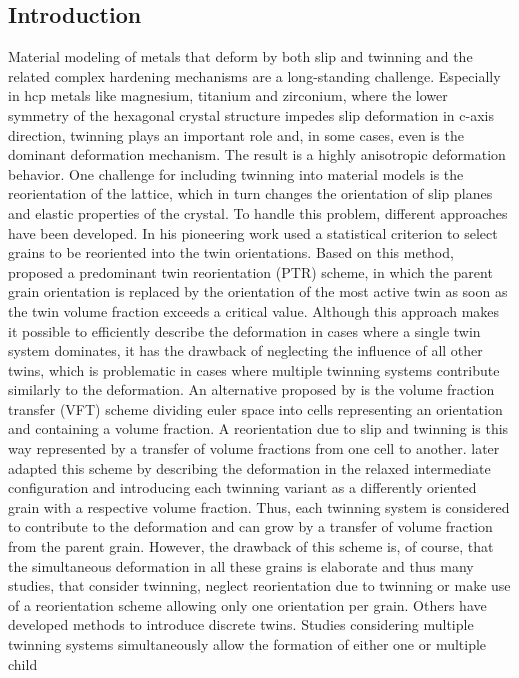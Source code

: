 \subsection{Introduction}
Material modeling of metals that deform by both slip and twinning and the related complex hardening mechanisms are a long-standing challenge. Especially in hcp metals like magnesium, titanium and zirconium, where the lower symmetry of the hexagonal crystal structure impedes slip deformation in c-axis direction, twinning plays an important role and, in some cases, even is the dominant deformation mechanism\supercite{yoo1981slip,yoo1991deformation,christian1995deformation,barnett2007twinning1,beyerlein2014growth,kannan2018mechanics}. The result is a highly anisotropic deformation behavior. One challenge for including twinning into material models is the reorientation of the lattice, which in turn changes the orientation of slip planes and elastic properties of the crystal. To handle this problem, different approaches have been developed. In his pioneering work  used a statistical criterion to select grains to be reoriented into the twin orientations. Based on this method,  proposed a predominant twin reorientation (PTR) scheme, in which the parent grain orientation is replaced by the orientation of the most active twin as soon as the twin volume fraction exceeds a critical value. Although this approach makes it possible to efficiently describe the deformation in cases where a single twin system dominates, it has the drawback of neglecting the influence of all other twins, which is problematic in cases where multiple twinning systems contribute similarly to the deformation. An alternative proposed by  is the volume fraction transfer (VFT) scheme dividing euler space into cells representing an orientation and containing a volume fraction. A reorientation due to slip and twinning is this way represented by a transfer of volume fractions from one cell to another.  later adapted this scheme by describing the deformation in the relaxed intermediate configuration and introducing each twinning variant as a differently oriented grain with a respective volume fraction. Thus, each twinning system is considered to contribute to the deformation and can grow by a transfer of volume fraction from the parent grain. However, the drawback of this scheme is, of course, that the simultaneous deformation in all these grains is elaborate and thus many studies, that consider twinning, neglect reorientation due to twinning\supercite{graff2007yielding,abdolvand2015study} or make use of a reorientation scheme allowing only one orientation per grain\supercite{karaman2000modeling,fernandez2011continuum,zhang2012phenomenological,qiao2016modeling,hama2017crystal,briffod2019numerical,zhang2019multi-scale}. Others have developed methods to introduce discrete twins\supercite{forest2000material,roy2015microscale,ardeljan2015explicit,rezaee-hajidehi_deformation_2022}. Studies considering multiple twinning systems simultaneously allow the formation of either one or multiple child 
